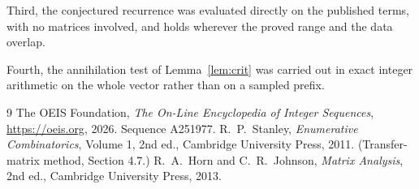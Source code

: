 \documentclass[11pt,a4paper]{article}
\theoremstyle{plain}
\theoremstyle{definition}
\begin{document}
Third, the conjectured recurrence was evaluated directly on the published terms, with no
matrices involved, and holds wherever the proved range and the data overlap.

Fourth, the annihilation test of Lemma~\ref{lem:crit} was carried out in exact integer
arithmetic on the whole vector rather than on a sampled prefix.

\begin{thebibliography}{9}
 The OEIS Foundation, \emph{The On-Line Encyclopedia of Integer
Sequences}, \url{https://oeis.org}, 2026. Sequence A251977.
 R.~P.~Stanley, \emph{Enumerative Combinatorics}, Volume 1, 2nd ed.,
Cambridge University Press, 2011. (Transfer-matrix method, Section 4.7.)
 R.~A.~Horn and C.~R.~Johnson, \emph{Matrix Analysis}, 2nd ed., Cambridge
University Press, 2013.
\end{thebibliography}
\end{document}
